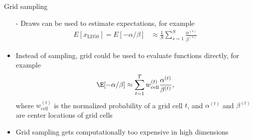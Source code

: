\documentclass[10pt]{beamer}
\begin{document}
\begin{frame}{Grid sampling}

  \begin{itemize}
  \item[-] Draws can be used to estimate expectations, for example
    \begin{align*}
      E[x_{\mathrm{LD50}}] = E[-\alpha/\beta] & \approx \frac{1}{S}\sum_{s=1}^{S} \frac{\alpha^{(s)}}{\beta^{(s)}}
    \end{align*}
  \item<2->[-] Instead of sampling, grid could be used to evaluate
    functions directly, for example
    \begin{align*}
      \E[-\alpha/\beta] \approx \sum_{t=1}^{T} w_{\mathrm{cell}}^{(t)} \frac{\alpha^{(t)}}{\beta^{(t)}},
    \end{align*}
    where $w_{\mathrm{cell}}^{(t)}$ is the normalized probability of a grid cell $t$, and $\alpha^{(t)}$ and $\beta^{(t)}$ are center locations of grid cells
  \item<3-> Grid sampling gets computationally too expensive in high
    dimensions
  \end{itemize}

\end{frame}
\end{document}

